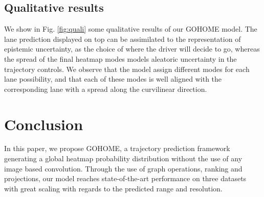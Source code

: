 \documentclass[letterpaper, 10 pt, conference]{ieeeconf}
\begin{document}
\subsection{Qualitative results}

We show in Fig. \ref{fig:quali} some qualitative results of our GOHOME model. The lane prediction displayed on top can be assimilated to the representation of epistemic uncertainty, as the choice of where the driver will decide to go, whereas the spread of the final heatmap modes models aleatoric uncertainty in the trajectory controls. 
We observe that the model assign different modes for each lane possibility, and that each of these modes is well aligned with the corresponding lane with a spread along the curvilinear direction. 








\section{Conclusion}
\label{sec:conclusion}




In this paper, we propose GOHOME, a trajectory prediction framework generating a global heatmap probability distribution without the use of any image based convolution. Through the use of graph operations, ranking and projections, our model reaches state-of-the-art performance on three datasets with great scaling with regards to the predicted range and resolution. 






























\clearpage
\printbibliography
\end{document}
